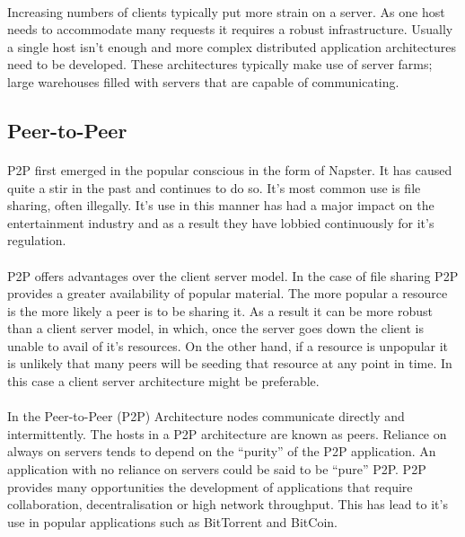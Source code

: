 \documentclass[11pt]{amsart}
\begin{document}
\paragraph{}
Increasing numbers of clients typically put more strain on a server. As one host needs to accommodate many requests it requires a robust infrastructure. Usually a single host isn't enough and more complex distributed application architectures need to be developed. These architectures typically make use of server farms; large warehouses filled with servers that are capable of communicating.

\subsection{Peer-to-Peer}
\paragraph{}
P2P first emerged in the popular conscious in the form of Napster. It has caused quite a stir in the past and continues to do so. It's most common use is file sharing, often illegally. It's use in this manner has had a major impact on the entertainment industry and as a result they have lobbied continuously for it's regulation.
\paragraph{}
 P2P offers advantages over the client server model. In the case of file sharing P2P provides a greater availability of popular material. The more popular a resource is the more likely a peer is to be sharing it. As a result it can be more robust than a client server model, in which, once the server goes down the client is unable to avail of it's resources. On the other hand, if a resource is unpopular it is unlikely that many peers will be seeding that resource at any point in time. In this case a client server architecture might be preferable.
\paragraph{}
In the Peer-to-Peer (P2P) Architecture nodes communicate directly and intermittently. The hosts in a P2P architecture are known as peers. Reliance on always on servers tends to depend on the ``purity'' of the P2P application. An application with no reliance on servers could be said to be ``pure'' P2P. P2P provides many opportunities the development of applications that require collaboration, decentralisation or high network throughput. This has lead to it's use in popular applications such as BitTorrent and BitCoin.
\end{document}
